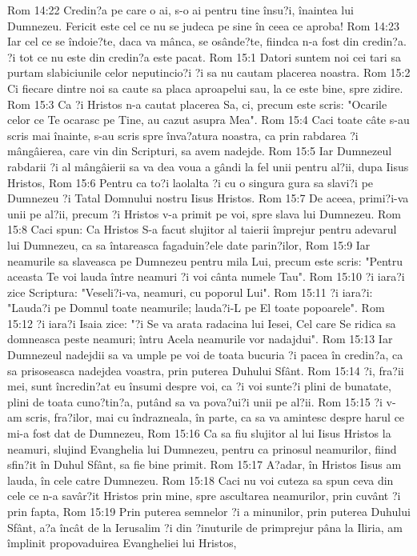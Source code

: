 Rom 14:22  Credin?a pe care o ai, s-o ai pentru tine însu?i, înaintea lui Dumnezeu. Fericit este cel ce nu se judeca pe sine în ceea ce aproba!
Rom 14:23  Iar cel ce se îndoie?te, daca va mânca, se osânde?te, fiindca n-a fost din credin?a. ?i tot ce nu este din credin?a este pacat.
Rom 15:1  Datori suntem noi cei tari sa purtam slabiciunile celor neputincio?i ?i sa nu cautam placerea noastra.
Rom 15:2  Ci fiecare dintre noi sa caute sa placa aproapelui sau, la ce este bine, spre zidire.
Rom 15:3  Ca ?i Hristos n-a cautat placerea Sa, ci, precum este scris: "Ocarile celor ce Te ocarasc pe Tine, au cazut asupra Mea".
Rom 15:4  Caci toate câte s-au scris mai înainte, s-au scris spre înva?atura noastra, ca prin rabdarea ?i mângâierea, care vin din Scripturi, sa avem nadejde.
Rom 15:5  Iar Dumnezeul rabdarii ?i al mângâierii sa va dea voua a gândi la fel unii pentru al?ii, dupa Iisus Hristos,
Rom 15:6  Pentru ca to?i laolalta ?i cu o singura gura sa slavi?i pe Dumnezeu ?i Tatal Domnului nostru Iisus Hristos.
Rom 15:7  De aceea, primi?i-va unii pe al?ii, precum ?i Hristos v-a primit pe voi, spre slava lui Dumnezeu.
Rom 15:8  Caci spun: Ca Hristos S-a facut slujitor al taierii împrejur pentru adevarul lui Dumnezeu, ca sa întareasca fagaduin?ele date parin?ilor,
Rom 15:9  Iar neamurile sa slaveasca pe Dumnezeu pentru mila Lui, precum este scris: "Pentru aceasta Te voi lauda între neamuri ?i voi cânta numele Tau".
Rom 15:10  ?i iara?i zice Scriptura: "Veseli?i-va, neamuri, cu poporul Lui".
Rom 15:11  ?i iara?i: "Lauda?i pe Domnul toate neamurile; lauda?i-L pe El toate popoarele".
Rom 15:12  ?i iara?i Isaia zice: "?i Se va arata radacina lui Iesei, Cel care Se ridica sa domneasca peste neamuri; întru Acela neamurile vor nadajdui".
Rom 15:13  Iar Dumnezeul nadejdii sa va umple pe voi de toata bucuria ?i pacea în credin?a, ca sa prisoseasca nadejdea voastra, prin puterea Duhului Sfânt.
Rom 15:14  ?i, fra?ii mei, sunt încredin?at eu însumi despre voi, ca ?i voi sunte?i plini de bunatate, plini de toata cuno?tin?a, putând sa va pova?ui?i unii pe al?ii.
Rom 15:15  ?i v-am scris, fra?ilor, mai cu îndrazneala, în parte, ca sa va amintesc despre harul ce mi-a fost dat de Dumnezeu,
Rom 15:16  Ca sa fiu slujitor al lui Iisus Hristos la neamuri, slujind Evanghelia lui Dumnezeu, pentru ca prinosul neamurilor, fiind sfin?it în Duhul Sfânt, sa fie bine primit.
Rom 15:17  A?adar, în Hristos Iisus am lauda, în cele catre Dumnezeu.
Rom 15:18  Caci nu voi cuteza sa spun ceva din cele ce n-a savâr?it Hristos prin mine, spre ascultarea neamurilor, prin cuvânt ?i prin fapta,
Rom 15:19  Prin puterea semnelor ?i a minunilor, prin puterea Duhului Sfânt, a?a încât de la Ierusalim ?i din ?inuturile de primprejur pâna la Iliria, am împlinit propovaduirea Evangheliei lui Hristos,
